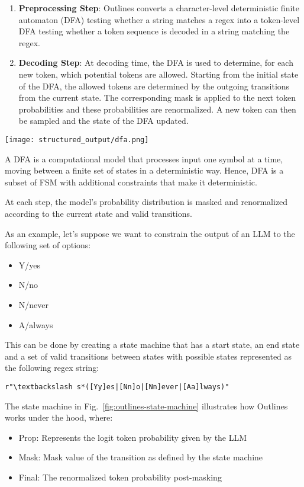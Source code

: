 \begin{enumerate}
    \item \textbf{Preprocessing Step}: Outlines converts a character-level deterministic finite automaton (DFA) testing whether a string matches a regex into a token-level DFA testing whether a token sequence is decoded in a string matching the regex.

    \item \textbf{Decoding Step}: At decoding time, the DFA is used to determine, for each new token, which potential tokens are allowed. Starting from the initial state of the DFA, the allowed tokens are determined by the outgoing transitions from the current state. The corresponding mask is applied to the next token probabilities and these probabilities are renormalized. A new token can then be sampled and the state of the DFA updated.
\end{enumerate}

\begin{marginfigure}
\texttt{[image: structured\_output/dfa.png]}
\caption[DFA Example]{A DFA is a computational model that processes input one symbol at a time, moving between a finite set of states in a deterministic way. Hence, DFA is a subset of FSM with additional constraints that make it deterministic.}
\end{marginfigure}

At each step, the model's probability distribution is masked and renormalized according to the current state and valid transitions.

As an example, let's suppose we want to constrain the output of an LLM to the following set of options: 
\begin{itemize}
    \item Y/yes
    \item N/no  
    \item N/never
    \item A/always
\end{itemize}

This can be done by creating a state machine that has a start state, an end state and a set of valid transitions between states with possible states represented as the following regex string: 

\begin{verbatim}
r"\textbackslash s*([Yy]es|[Nn]o|[Nn]ever|[Aa]lways)"
\end{verbatim}

The state machine in Fig.~\ref{fig:outlines-state-machine} illustrates how Outlines works under the hood, where:
\begin{itemize}
    \item Prop: Represents the logit token probability given by the LLM
    \item Mask: Mask value of the transition as defined by the state machine  
    \item Final: The renormalized token probability post-masking
\end{itemize}

